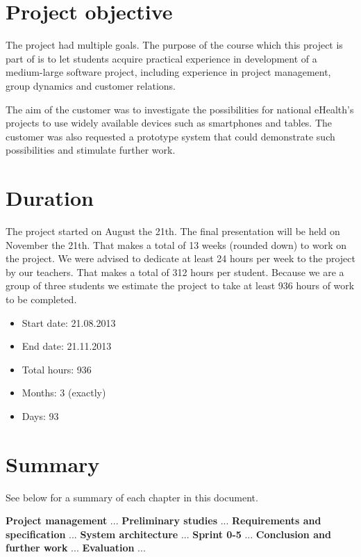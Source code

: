 
\section{Project objective}
\label{section:objective}

The project had multiple goals.
The purpose of the course which this project is part of is to let students acquire practical experience in development of a medium-large software project, including experience in project management, group dynamics and customer relations.

The aim of the customer was to investigate the possibilities for national eHealth's projects to use widely available devices such as smartphones and tables. The customer was also requested a prototype system that could demonstrate such possibilities and stimulate further work.

\section{Duration}
\label{section:duration}
The project started on August the 21th. The final presentation will be held on November the 21th.
That makes a total of 13 weeks (rounded down) to work on the project.
We were advised to dedicate at least 24 hours per week to the project by our teachers.
That makes a total of 312 hours per student. Because we are a group of three students we estimate
the project to take at least 936 hours of work to be completed.

\begin{itemize}
\item Start date: 21.08.2013
\item End date: 21.11.2013
\item Total hours: 936
\item Months: 3 (exactly)
\item Days: 93
\end{itemize}

\section{Summary}

See below for a summary of each chapter in this document.

\textbf{Project management}\newline
...
\textbf{Preliminary studies}\newline
...
\textbf{Requirements and specification}\newline
...
\textbf{System architecture}\newline
...
\textbf{Sprint 0-5}\newline
...
\textbf{Conclusion and further work}\newline
...
\textbf{Evaluation}\newline
...
